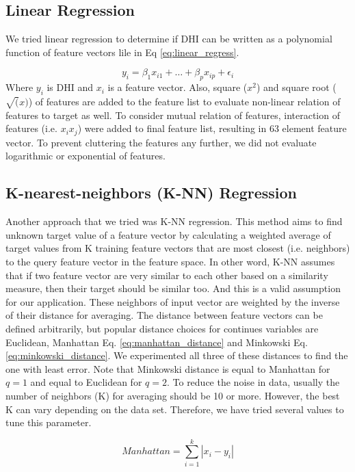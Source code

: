 \subsection{Linear Regression}
\label{sec:lin_reg}
We tried linear regression to determine if DHI can be written as a polynomial function of feature vectors lile in Eq \ref{eq:linear_regress}.

\begin{equation}
\label{eq:linear_regress}
y_i = \beta_{1}x_{i1} + \ldots + \beta_{p}x_{ip} + \epsilon_{i}
\end{equation}
Where $y_i$ is DHI and $x_i$ is a feature vector. Also, square ($x^{2}$) and square root ($\sqrt(x)$) of features are added to the feature list to evaluate non-linear relation of features to target as well. To consider mutual relation of features, interaction of features (i.e. $x_{i}x_{j}$) were added to final feature list, resulting in 63 element feature vector. To prevent cluttering the features any further, we did not evaluate logarithmic or exponential of features.

\subsection{K-nearest-neighbors (K-NN) Regression}
Another approach that we tried was K-NN regression. This method aims to find unknown target value of a feature vector by calculating a weighted average of target values from K training feature vectors that are most closest (i.e. neighbors) to the query feature vector in the feature space. In other word, K-NN assumes that if two feature vector are very similar to each other based on a similarity measure, then their target should be similar too. And this is a valid assumption for our application. These neighbors of input vector are weighted by the inverse of their distance for averaging. The distance between feature vectors can be defined arbitrarily, but popular distance choices for continues variables are Euclidean, Manhattan Eq. \ref{eq:manhattan_distance} and Minkowski Eq. \ref{eq:minkowski_distance}. We experimented all three of these distances to find the one with least error. Note that Minkowski distance is equal to Manhattan for $q=1$ and equal to Euclidean for $q=2$.
To reduce the noise in data, usually the number of neighbors (K) for averaging should be 10 or more. However, the best K can vary depending on the data set. Therefore, we have tried several values to tune this parameter.

\begin{equation}
\label{eq:manhattan_distance}
Manhattan = \sum_{i=1}^{k} |x_i - y_i|
\end{equation}

